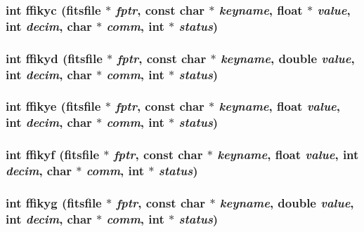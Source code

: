 \subsubsection{\setlength{\rightskip}{0pt plus 5cm}int ffikyc (\bf{fitsfile} $\ast$ {\em fptr}, const char $\ast$ {\em keyname}, float $\ast$ {\em value}, int {\em decim}, char $\ast$ {\em comm}, int $\ast$ {\em status})}\label{fitsio_8h_bf26af1c6bb6452cc6d4b4e9b794175c}


\subsubsection{\setlength{\rightskip}{0pt plus 5cm}int ffikyd (\bf{fitsfile} $\ast$ {\em fptr}, const char $\ast$ {\em keyname}, double {\em value}, int {\em decim}, char $\ast$ {\em comm}, int $\ast$ {\em status})}\label{fitsio_8h_80b6addc96fa00ec452a71201de4c474}


\subsubsection{\setlength{\rightskip}{0pt plus 5cm}int ffikye (\bf{fitsfile} $\ast$ {\em fptr}, const char $\ast$ {\em keyname}, float {\em value}, int {\em decim}, char $\ast$ {\em comm}, int $\ast$ {\em status})}\label{fitsio_8h_5be69827a5b1a21b310dc0e73e59c450}


\subsubsection{\setlength{\rightskip}{0pt plus 5cm}int ffikyf (\bf{fitsfile} $\ast$ {\em fptr}, const char $\ast$ {\em keyname}, float {\em value}, int {\em decim}, char $\ast$ {\em comm}, int $\ast$ {\em status})}\label{fitsio_8h_ad8778b73662002f227e92cca425ce1a}


\subsubsection{\setlength{\rightskip}{0pt plus 5cm}int ffikyg (\bf{fitsfile} $\ast$ {\em fptr}, const char $\ast$ {\em keyname}, double {\em value}, int {\em decim}, char $\ast$ {\em comm}, int $\ast$ {\em status})}\label{fitsio_8h_24996516801432718d31f7426d064006}


